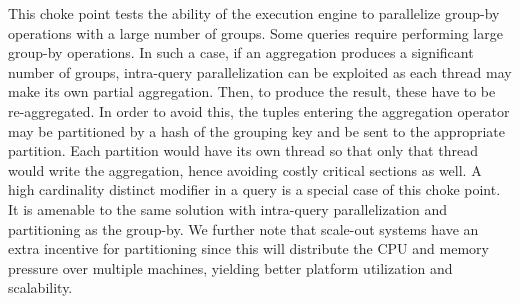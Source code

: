 
This choke point tests the ability of the execution engine to parallelize
group-by operations with a large number of groups. Some queries require
performing large group-by operations. In such a case, if an aggregation produces
a significant number of groups, intra-query parallelization can be exploited as
each thread may make its own partial aggregation. Then, to produce the result,
these have to be re-aggregated. In order to avoid this, the tuples entering the
aggregation operator may be partitioned by a hash of the grouping key and be
sent to the appropriate partition. Each partition would have its own thread so
that only that thread would write the aggregation, hence avoiding costly
critical sections as well. A high cardinality distinct modifier in a query is a
special case of this choke point. It is amenable to the same solution with
intra-query parallelization and partitioning as the group-by. We further note
that scale-out systems have an extra incentive for partitioning since this will
distribute the CPU and memory pressure over multiple machines, yielding better
platform utilization and scalability.


